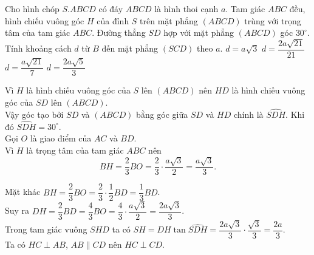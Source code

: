 \begin{ex}%
 Cho hình chóp $S.ABCD$ có đáy $ABCD$ là hình thoi cạnh $a$. Tam giác $ABC$ đều, hình chiếu vuông góc $H$ của đỉnh $S$ trên mặt phẳng $(ABCD)$ trùng với trọng tâm của tam giác $ABC$. Đường thẳng $SD$ hợp với mặt phẳng $(ABCD)$ góc $30^\circ$. Tính khoảng cách $d$ từ $B$ đến mặt phẳng $(SCD)$ theo $a$.
 \choice
  {$d=a\sqrt{3}$}
  {$d=\dfrac{2a\sqrt{21}}{21}$}
  {\True $d=\dfrac{a\sqrt{21}}{7}$}
  {$d=\dfrac{2a\sqrt{5}}{3}$}
 \loigiai
  {
  \immini
  {
  Vì $H$ là hình chiếu vuông góc của $S$ lên $(ABCD)$ nên $HD$ là hình chiếu vuông góc của $SD$ lên $(ABCD)$.\\
  Vậy góc tạo bởi $SD$ và $(ABCD)$ bằng góc giữa $SD$ và $HD$ chính là $\widehat{SDH}$. Khi đó $\widehat{SDH} = 30^\circ$.\\
  Gọi $O$ là giao điểm của $AC$ và $BD$.\\
  Vì $H$ là trọng tâm của tam giác $ABC$ nên $$BH= \dfrac{2}{3}BO = \dfrac{2}{3}\cdot \dfrac{a\sqrt{3}}{2} = \dfrac{a\sqrt{3}}{3}.$$
  }
  {
  }
  \noindent
  Mặt khác $BH = \dfrac{2}{3}BO = \dfrac{2}{3} \cdot \dfrac{1}{2}BD = \dfrac{1}{3}BD$.\\
  Suy ra $DH = \dfrac{2}{3}BD = \dfrac{4}{3}BO = \dfrac{4}{3}\cdot \dfrac{a\sqrt{3}}{2} = \dfrac{2a\sqrt{3}}{3}$.\\
  Trong tam giác vuông $SHD$ ta có $SH = DH\tan \widehat{SDH} = \dfrac{2a\sqrt{3}}{3} \cdot \dfrac{\sqrt{3}}{3} = \dfrac{2a}{3}$.\\
  Ta có $HC \perp AB$, $AB \parallel CD$ nên $HC \perp CD$.\\
}
\end{ex}
